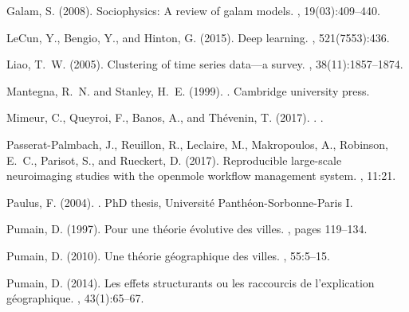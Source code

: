 \documentclass[graybox]{svmult}
\begin{document}
\begin{thebibliography}{}
Galam, S. (2008).
\newblock Sociophysics: A review of galam models.
, 19(03):409--440.

LeCun, Y., Bengio, Y., and Hinton, G. (2015).
\newblock Deep learning.
, 521(7553):436.

Liao, T.~W. (2005).
\newblock Clustering of time series data—a survey.
, 38(11):1857--1874.

Mantegna, R.~N. and Stanley, H.~E. (1999).
.
\newblock Cambridge university press.

Mimeur, C., Queyroi, F., Banos, A., and Th{\'e}venin, T. (2017).
.
.

Passerat-Palmbach, J., Reuillon, R., Leclaire, M., Makropoulos, A., Robinson,
  E.~C., Parisot, S., and Rueckert, D. (2017).
\newblock Reproducible large-scale neuroimaging studies with the openmole
  workflow management system.
, 11:21.

Paulus, F. (2004).
.
\newblock PhD thesis, Universit{\'e} Panth{\'e}on-Sorbonne-Paris I.

Pumain, D. (1997).
\newblock Pour une th{\'e}orie {\'e}volutive des villes.
, pages 119--134.

Pumain, D. (2010).
\newblock Une th{\'e}orie g{\'e}ographique des villes.
,
  55:5--15.

Pumain, D. (2014).
\newblock Les effets structurants ou les raccourcis de l'explication
  g{\'e}ographique.
, 43(1):65--67.


\end{thebibliography}
\end{document}
